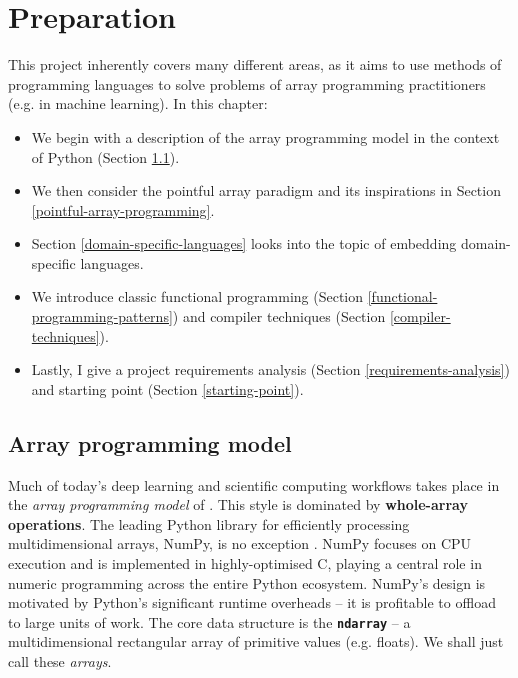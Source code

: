 \chapter{Preparation}

This project inherently covers many different areas, as it aims to use methods of programming languages to solve problems of array programming practitioners (e.g. in machine learning). In this chapter:
\begin{itemize}
    \item We begin with a description of the array programming model in the context of Python (Section \ref{array-programming-model}).
    \item We then consider the pointful array paradigm and its inspirations in Section \ref{pointful-array-programming}.
    \item Section \ref{domain-specific-languages} looks into the topic of embedding domain-specific languages.
    \item We introduce classic functional programming (Section \ref{functional-programming-patterns}) and compiler techniques (Section \ref{compiler-techniques}).
    \item Lastly, I give a project requirements analysis (Section \ref{requirements-analysis}) and starting point (Section \ref{starting-point}).
\end{itemize}

\section{Array programming model}
\label{array-programming-model}

Much of today's deep learning and scientific computing workflows takes place in the \textit{array programming model} of \textcite{iverson1962programming}. 
This style is dominated by \textbf{whole-array operations}. 
The leading Python library for efficiently processing multidimensional arrays, NumPy, is no exception \cite{harris2020array}. 
NumPy focuses on CPU execution and is implemented in highly-optimised C, playing a central role in numeric programming across the entire Python ecosystem. 
NumPy's design is motivated by Python's significant runtime overheads -- it is profitable to offload to large units of work. The core data structure is the \texttt{\textbf{ndarray}} -- a multidimensional rectangular array of primitive values (e.g. floats). We shall just call these \textit{arrays}. 

